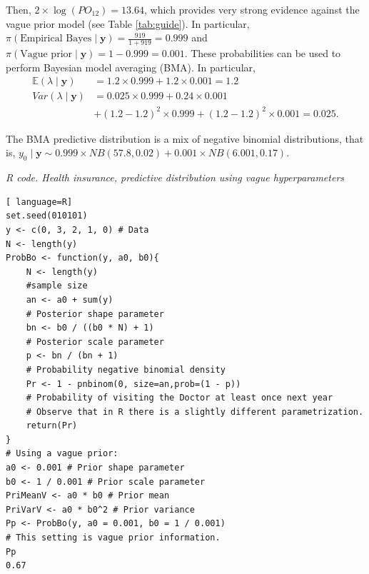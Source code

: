 Then, $2 \times \log(PO_{12}) = 13.64$, which provides very strong evidence against the vague prior model (see Table \ref{tab:guide}). In particular, $\pi(\text{Empirical Bayes} \mid \mathbf{y}) = \frac{919}{1 + 919} = 0.999$ and $\pi(\text{Vague prior} \mid \mathbf{y}) = 1 - 0.999 = 0.001$. These probabilities can be used to perform Bayesian model averaging (BMA). In particular,
\begin{align*}
	\mathbb{E}(\lambda\mid \mathbf{y})&=1.2\times 0.999+1.2\times 0.001=1.2\\
	Var(\lambda\mid \mathbf{y})&=0.025\times 0.999+0.24\times 0.001\\
	& + (1.2-1.2)^2\times 0.999 + (1.2-1.2)^2\times 0.001= 0.025.
\end{align*}

The BMA predictive distribution is a mix of negative binomial distributions, that is, $y_0\mid \mathbf{y}\sim 0.999\times NB(57.8, 0.02)+0.001\times NB(6.001, 0.17)$.

\begin{tcolorbox}[enhanced,width=4.67in,center upper,
	fontupper=\large\bfseries,drop shadow southwest,sharp corners]
\textit{R code. Health insurance, predictive distribution using vague hyperparameters}
\begin{VF}
\begin{lstlisting}[ language=R]
set.seed(010101)
y <- c(0, 3, 2, 1, 0) # Data
N <- length(y)
ProbBo <- function(y, a0, b0){
	N <- length(y)
	#sample size
	an <- a0 + sum(y) 
	# Posterior shape parameter
	bn <- b0 / ((b0 * N) + 1) 
	# Posterior scale parameter
	p <- bn / (bn + 1) 
	# Probability negative binomial density
	Pr <- 1 - pnbinom(0, size=an,prob=(1 - p)) 
	# Probability of visiting the Doctor at least once next year
	# Observe that in R there is a slightly different parametrization.
	return(Pr)
} 
# Using a vague prior:
a0 <- 0.001 # Prior shape parameter
b0 <- 1 / 0.001 # Prior scale parameter
PriMeanV <- a0 * b0 # Prior mean
PriVarV <- a0 * b0^2 # Prior variance
Pp <- ProbBo(y, a0 = 0.001, b0 = 1 / 0.001) 
# This setting is vague prior information.
Pp
0.67
\end{lstlisting}
\end{VF}
\end{tcolorbox} 

